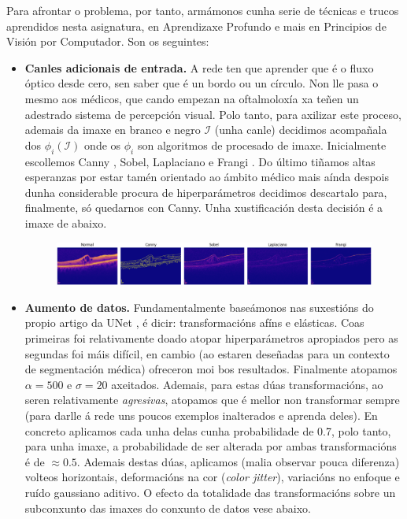 \documentclass{article}
\begin{document}
Para afrontar o problema, por tanto, armámonos cunha serie de técnicas e trucos aprendidos nesta asignatura, en Aprendizaxe Profundo e mais en Principios de Visión por Computador. Son os seguintes:
\begin{itemize}
	\item \textbf{Canles adicionais de entrada.} A rede ten que aprender que é o fluxo óptico desde cero, sen saber que é un bordo ou un círculo. Non lle pasa o mesmo aos médicos, que cando empezan na oftalmoloxía xa teñen un adestrado sistema de percepción visual. Polo tanto, para axilizar este proceso, ademais da imaxe en branco e negro $\mathcal{I}$ (unha canle) decidimos acompañala dos $\phi_i(\mathcal{I})$ onde os $\phi_i$ son algoritmos de procesado de imaxe. Inicialmente escollemos Canny \cite{canny1986computational}, Sobel, Laplaciano e Frangi \cite{frangi1998multiscale}. Do último tiñamos altas esperanzas por estar tamén orientado ao ámbito médico mais aínda despois dunha considerable procura de hiperparámetros decidimos descartalo para, finalmente, só quedarnos con Canny. Unha xustificación desta decisión é a imaxe de abaixo. 

\begin{figure}[H]
	\centering
	\includegraphics[width=\linewidth]{figuras/canles.png}
	\label{fig:canles}
\end{figure}


\item \textbf{Aumento de datos.} Fundamentalmente baseámonos nas suxestións do propio artigo da UNet \cite{ronneberger2015u}, é dicir: transformacións afíns e elásticas. Coas primeiras foi relativamente doado atopar hiperparámetros apropiados pero as segundas foi máis difícil, en cambio (ao estaren deseñadas para un contexto de segmentación médica) ofreceron moi bos resultados. Finalmente atopamos $\alpha = 500$ e $\sigma = 20$ axeitados. Ademais, para estas dúas transformacións, ao seren relativamente \emph{agresivas}, atopamos que é mellor non transformar sempre (para darlle á rede uns poucos exemplos inalterados e aprenda deles). En concreto aplicamos cada unha delas cunha probabilidade de 0.7, polo tanto, para unha imaxe, a probabilidade de ser alterada por ambas transformacións é de $\approx 0.5$. Ademais destas dúas, aplicamos (malia observar pouca diferenza) volteos horizontais, deformacións na cor (\emph{color jitter}), variacións no enfoque e ruído gaussiano aditivo. O efecto da totalidade das transformacións sobre un subconxunto das imaxes do conxunto de datos vese abaixo.


\end{itemize}
\end{document}
